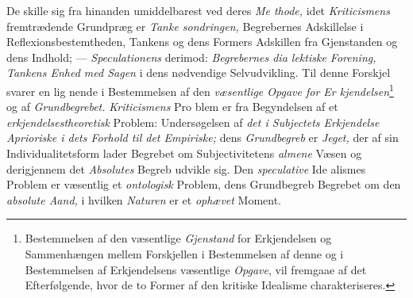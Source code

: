 De skille sig fra hinanden umiddelbarest ved deres \emph{Me\-%
thode,} idet \emph{Kriticismens} fremtrædende Grundpræg er \emph{Tanke\-%
sondringen,} Begrebernes Adskillelse i Reflexionsbestemtheden,
Tankens og dens Formers Adskillen fra Gjenstanden og dens
Indhold; --- \emph{Speculationens} derimod: \emph{Begrebernes dia\-%
lektiske Forening, Tankens Enhed med Sagen} i dens
nødvendige Selvudvikling. Til denne Forskjel svarer en lig\-%
nende i Bestemmelsen af den \emph{væsentlige Opgave for Er\-%
\setcounter{footnote}{0}%
kjendelsen}\footnote{Bestemmelsen af den væsentlige \emph{Gjenstand} for Erkjendelsen og Sammenhængen mellem Forskjellen i Bestemmelsen af denne og i Bestemmelsen af Erkjendelsens væsentlige \emph{Opgave}, vil fremgaae af det Efterfølgende, hvor de to Former af den kritiske Idealisme charakteriseres.} og af \emph{Grundbegrebet.} \emph{Kriticismens} Pro\-%
blem er fra Begyndelsen af et \emph{erkjendelsestheoretisk}
Problem: Undersøgelsen af \emph{det i Subjectets Erkjendelse
Aprioriske i dets Forhold til det Empiriske;} dens
\emph{Grundbegreb} er \emph{Jeget,} der af sin Individualitetsform lader
Begrebet om Subjectivitetens \emph{almene} Væsen og derigjennem
det \emph{Absolutes} Begreb udvikle sig. Den \emph{speculative} Ide\-%
alismes Problem er væsentlig et \emph{ontologisk} Problem, dens
Grundbegreb Begrebet om den \emph{absolute Aand,} i hvilken
\emph{Naturen} er et \emph{ophævet} Moment.

